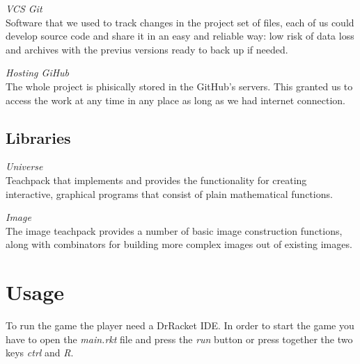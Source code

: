 \documentclass{article}
\begin{document}
 \textit{VCS Git}\\
Software that we used to track changes in the project set of files, each of us could develop source code and share it in an easy and reliable way: low risk of data loss and archives with the previus versions ready to back up if needed.

 \textit{Hosting GiHub}\\
The whole project is phisically stored in the GitHub's servers. This granted us to access the work at any time in any place as long as we had internet connection.

\subsection{Libraries}
 \hspace{0.5cm}\textit{Universe}\\
 Teachpack that implements and provides the functionality for creating interactive, graphical programs that consist of plain mathematical functions.
 
 \textit{Image}\\
The image teachpack provides a number of basic image construction functions, along with combinators for building more complex images out of existing images.

 \section{Usage}
To run the game the player need a DrRacket IDE. In order to start the game you have to open the \textit{main.rkt} file and press the \textit{run} button or press together the two keys \textit{ctrl} and \textit{R}.

\end{document}
